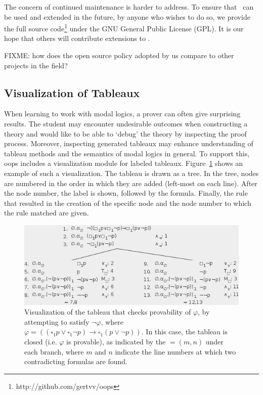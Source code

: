 The concern of continued maintenance is harder to address. To ensure that
\oops\ can be used and extended in the future, by anyone who wishes to do so,
we provide the full source code\footnote{http://github.com/gertvv/oops} under
the GNU General Public License (GPL). It is our hope that others will
contribute extensions to \oops.

FIXME: how does the open source policy adopted by us compare to other projects
in the field?


\subsection{Visualization of Tableaux}

When learning to work with modal logics, a prover can often give surprising
results. The student may encounter undesirable outcomes when constructing a
theory and would like to be able to `debug' the theory by inspecting the proof
process. Moreover, inspecting generated tableaux may enhance understanding of
tableau methods and the semantics of modal logics in general.
To support this, oops includes a visualization module for labeled tableaux.
Figure~\ref{fig:tableauVis} shows an example of such a visualization. 
The tableau is drawn as a tree.
In the tree, nodes are numbered  in the order in which they are added
(left-most on each line).
After the node number, the
label is shown, followed by the formula. Finally, the rule that resulted in
the creation of the specific node and the node number to which the rule
matched are given.

\begin{figure}[p]
\centering
\includegraphics[scale=.55]{images/tableauVis}
\caption{Visualization of the tableau that checks provability of $\varphi$, by
attempting to satisfy $\neg \varphi$, where
$\varphi = ((\square_1 p \vee \square_1 \neg p) \to \square_1(p \vee \neg p))$.
In this case, the tableau is closed (i.e. $\varphi$ is provable), as indicated
by the $= (m, n)$ under each branch, where $m$ and $n$ indicate the line
numbers at which two contradicting formulas are found.}
\label{fig:tableauVis}
\end{figure}

